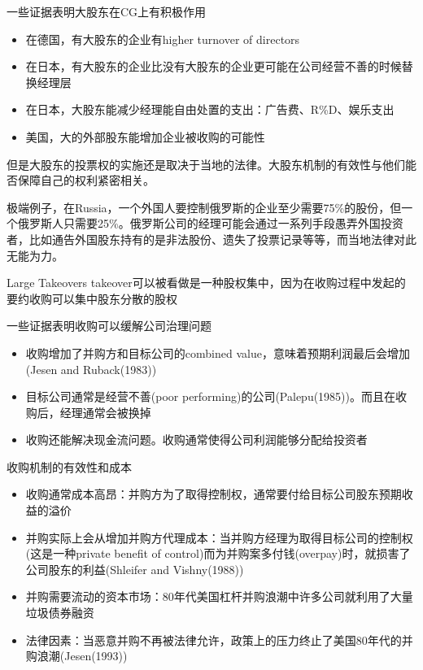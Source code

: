 	\begin{frame}
	一些证据表明大股东在CG上有积极作用
	\begin{itemize}
		\item 在德国，有大股东的企业有higher turnover of directors
		\item 在日本，有大股东的企业比没有大股东的企业更可能在公司经营不善的时候替换经理层
		\item 在日本，大股东能减少经理能自由处置的支出：广告费、R\%D、娱乐支出
		\item 美国，大的外部股东能增加企业被收购的可能性
	\end{itemize}
	 但是大股东的投票权的实施还是取决于当地的法律。大股东机制的有效性与他们能否保障自己的权利紧密相关。\par
	 极端例子，在Russia，一个外国人要控制俄罗斯的企业至少需要75\%的股份，但一个俄罗斯人只需要25\%。俄罗斯公司的经理可能会通过一系列手段愚弄外国投资者，比如通告外国股东持有的是非法股份、遗失了投票记录等等，而当地法律对此无能为力。
\end{frame}	

%
\begin{frame}{Large Takeovers}
	takeover可以被看做是一种股权集中，因为在收购过程中发起的要约收购可以集中股东分散的股权\par
	 一些证据表明收购可以缓解公司治理问题
	\begin{itemize}
	\item 收购增加了并购方和目标公司的combined value，意味着预期利润最后会增加(Jesen and Ruback(1983))
	\item 目标公司通常是经营不善(poor performing)的公司(Palepu(1985))。而且在收购后，经理通常会被换掉
	\item 收购还能解决现金流问题。收购通常使得公司利润能够分配给投资者
	\end{itemize}

\end{frame}

\begin{frame}{收购机制的有效性和成本}
	
	\begin{itemize}
	\item 收购通常成本高昂：并购方为了取得控制权，通常要付给目标公司股东预期收益的溢价
	\item 并购实际上会从增加并购方代理成本：当并购方经理为取得目标公司的控制权(这是一种private benefit of control)而为并购案多付钱(overpay)时，就损害了公司股东的利益(Shleifer and Vishny(1988))
	\item 并购需要流动的资本市场：80年代美国杠杆并购浪潮中许多公司就利用了大量垃圾债券融资
	\item 法律因素：当恶意并购不再被法律允许，政策上的压力终止了美国80年代的并购浪潮(Jesen(1993))
	\end{itemize}

\end{frame}

